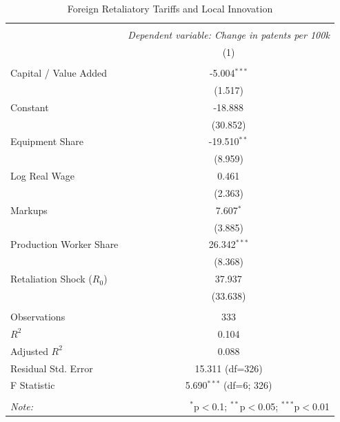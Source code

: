 \begin{table}[!htbp] \centering
  \caption{Foreign Retaliatory Tariffs and Local Innovation}
  \label{tab:retaliation_regression}
\begin{tabular}{@{\extracolsep{5pt}}lc}
\\[-1.8ex]\hline
\hline \\[-1.8ex]
& \multicolumn{1}{c}{\textit{Dependent variable: Change in patents per 100k}} \
\cr \cline{2-2}
\\[-1.8ex] & (1) \\
\hline \\[-1.8ex]
 Capital / Value Added & -5.004$^{***}$ \\
& (1.517) \\
 Constant & -18.888$^{}$ \\
& (30.852) \\
 Equipment Share & -19.510$^{**}$ \\
& (8.959) \\
 Log Real Wage & 0.461$^{}$ \\
& (2.363) \\
 Markups & 7.607$^{*}$ \\
& (3.885) \\
 Production Worker Share & 26.342$^{***}$ \\
& (8.368) \\
 Retaliation Shock ($R_0$) & 37.937$^{}$ \\
& (33.638) \\
\hline \\[-1.8ex]
 Observations & 333 \\
 $R^2$ & 0.104 \\
 Adjusted $R^2$ & 0.088 \\
 Residual Std. Error & 15.311 (df=326) \\
 F Statistic & 5.690$^{***}$ (df=6; 326) \\
\hline
\hline \\[-1.8ex]
\textit{Note:} & \multicolumn{1}{r}{$^{*}$p$<$0.1; $^{**}$p$<$0.05; $^{***}$p$<$0.01} \\
\end{tabular}
\end{table}